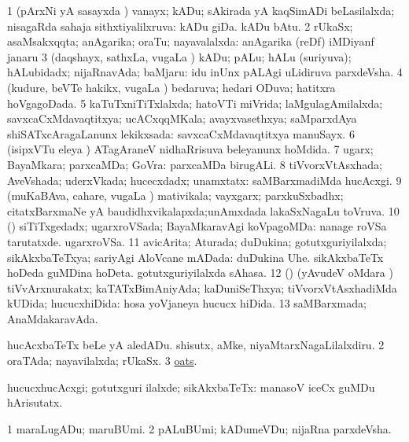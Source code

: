 \bentry
{} 
\gl{\gu}
\expl{}
\bmng
\bnum
\num{1} (pArxNi yA sasayxda \vi) vanayx; kADu; sAkirada yA kaqSimADi beLasilalxda; nisagaRda sahaja sithxtiyalilxruva:  kADu giDa.  kADu bAtu. 
\num{2} rUkaSx; asaMsakxqqta; anAgarika; oraTu; nayavalalxda:  anAgarika (reDf) iMDiyanf janaru 
\num{3} (daqshayx, sathxLa, \mo vugaLa \vi) kADu; pALu; hALu (suriyuva); hALubidadx; nijaRnavAda; baMjaru:  idu inUnx pALAgi uLidiruva parxdeVsha. 
\num{4} (kudure, beVTe hakikx, \mo vugaLa \vi) bedaruva; hedari ODuva; hatitxra hoVgagoDada. 
\num{5} kaTuTxniTiTxlalxda; hatoVTi miVrida; laMgulagAmilalxda; savxcaCxMdavaqtitxya; ucACxqqMKala; avayxvasethxya; saMparxdAya shiSATxcAragaLanunx lekikxsada:  savxcaCxMdavaqtitxya manuSayx. 
\num{6} (isipxVTu eleya \vi) ATagAraneV nidhaRrisuva beleyanunx hoMdida. 
\num{7} ugarx; BayaMkara; parxcaMDa; GoVra:  parxcaMDa birugALi. 
\num{8} tiVvorxVtAsxhada; AveVshada; uderxVkada; hucecxdadx; unamxtatx:  saMBarxmadiMda hucAcxgi. 
\num{9} (muKaBAva, cahare, \mo vugaLa \vi) mativikala; vayxgarx; parxkuSxbadhx; citatxBarxmaNe yA baudidhxvikalapxda;unAmxdada lakaSxNagaLu toVruva. 
\num{10} (\AmA) siTiTxgedadx; ugarxroVSada; BayaMkaravAgi koVpagoMDa:  nanage roVSa tarutatxde.  ugarxroVSa. 
\num{11} avicArita; Aturada; duDukina; gotutxguriyilalxda; sikAkxbaTeTxya; sariyAgi AloVcane mADada:  duDukina Uhe.  sikAkxbaTeTx hoDeda guMDina hoDeta.  gotutxguriyilalxda sAhasa. 
\num{12} (\AmA) (yAvudeV oMdara \vi) tiVvArxnurakatx; kaTATxBimAniyAda; kaDuniSeThxya; tiVvorxVtAsxhadiMda kUDida; hucucxhiDida:  hosa yoVjaneya hucucx hiDida. 
\num{13} saMBarxmada; AnaMdakaravAda. 
\enum
\emng

\noindent 
\gl{\pagu}
\bmng
\bnum
{}  
\banum
{} hucAcxbaTeTx beLe yA aledADu. 
 shisutx, aMke, niyaMtarxNagaLilalxdiru. 
\eanum
\numie
\num{2}  oraTAda; nayavilalxda; rUkaSx. 
\num{3}  \hyperref{kandict_o.pdf}{O}{oat pagu(3)}{oats}. 
\enum
\emng
\eentry

\bentry
{}
\gl{\kirxvi}
\bmng
hucucxhucAcxgi; gotutxguri ilalxde; sikAkxbaTeTx:  manasoV iceCx guMDu hArisutatx. 
\emng
\eentry

\bentry
{}
\gl{\nA}
\expl{}
\bmng
\bnum
\num{1} maraLugADu; maruBUmi. 
\num{2} pALuBUmi; kADumeVDu; nijaRna parxdeVsha. 
\enum
\emng

